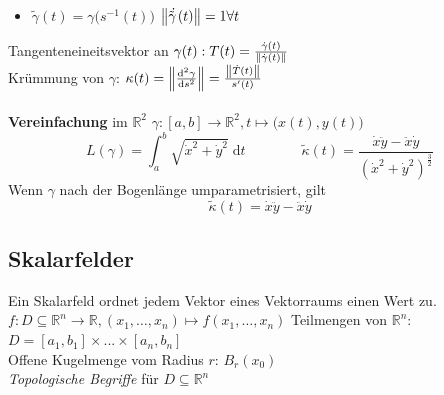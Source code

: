 \documentclass[6pt,a4paper]{scrartcl}
\newcommand{\norm}[2][\relax]{\ifx#1\relax \ensuremath{\left\Vert#2\right\Vert}\else \ensuremath{\left\Vert#2\right\Vert_{#1}}\fi}
\begin{document}
\begin{multicols*}{4}
\begin{itemize}
	\item $\tilde \gamma(t)=\gamma \bigl(s^{-1}(t) \bigr)$ \qquad $\norm{\ \dot{\tilde \!\! \gamma \!}\; (t)}=1 \forall t$ %
\end{itemize}
Tangenteneineitsvektor an $\gamma(t): T(t)=\frac{\dot \gamma(t)}{\norm{\dot \gamma(t)} }$\\
Krümmung von $\gamma$: $\kappa(t)= \norm{\frac{\mathrm d^2 \gamma}{\mathrm d s^2}} = \frac{\norm{\dot T(t)}}{s'(t)}$\\
\\
\textbf{Vereinfachung} im $\mathbb{R}^2$ \qquad $\gamma:[a,b] \rightarrow \mathbb R^2, t \mapsto \bigl(x(t),y(t)\bigr)$ \\
\begin{equation*}
L(\gamma) = \int_a^b \sqrt{\dot x^2 + \dot y^2}\; \mathrm dt \qquad \qquad \tilde{\kappa}(t)=\frac{\dot x \ddot y - \ddot x \dot y}{(\dot x^2 + \dot y^2)^{\frac{3}{2}}}
\end{equation*}
Wenn $\gamma$ nach der Bogenlänge umparametrisiert, gilt 
\begin{equation*}
\tilde{\kappa}(t)=\dot x \ddot y - \ddot x \dot y
\end{equation*}



\subsection{Skalarfelder}
Ein Skalarfeld ordnet jedem Vektor eines Vektorraums einen Wert zu.\\
$ f:D\subseteq \mathbb R^n \rightarrow \mathbb R, (x_1,\ldots ,x_n) \mapsto f(x_1,\ldots ,x_n) $
Teilmengen von $\mathbb R^n$: $D = [a_1,b_1] \times ... \times [a_n,b_n]$\\
Offene Kugelmenge vom Radius $r$: $B_r(x_0)$\\
\emph{Topologische Begriffe} für $D \subseteq \mathbb R^n$


\end{multicols*}
\end{document}
